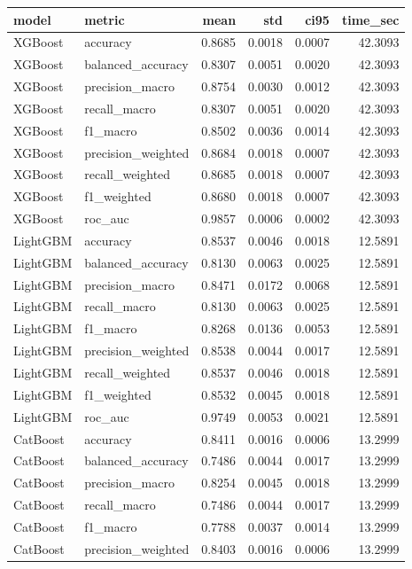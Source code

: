 \begin{tabular}{llrrrr}
\toprule
model & metric & mean & std & ci95 & time_sec \\
\midrule
XGBoost & accuracy & 0.8685 & 0.0018 & 0.0007 & 42.3093 \\
XGBoost & balanced_accuracy & 0.8307 & 0.0051 & 0.0020 & 42.3093 \\
XGBoost & precision_macro & 0.8754 & 0.0030 & 0.0012 & 42.3093 \\
XGBoost & recall_macro & 0.8307 & 0.0051 & 0.0020 & 42.3093 \\
XGBoost & f1_macro & 0.8502 & 0.0036 & 0.0014 & 42.3093 \\
XGBoost & precision_weighted & 0.8684 & 0.0018 & 0.0007 & 42.3093 \\
XGBoost & recall_weighted & 0.8685 & 0.0018 & 0.0007 & 42.3093 \\
XGBoost & f1_weighted & 0.8680 & 0.0018 & 0.0007 & 42.3093 \\
XGBoost & roc_auc & 0.9857 & 0.0006 & 0.0002 & 42.3093 \\
LightGBM & accuracy & 0.8537 & 0.0046 & 0.0018 & 12.5891 \\
LightGBM & balanced_accuracy & 0.8130 & 0.0063 & 0.0025 & 12.5891 \\
LightGBM & precision_macro & 0.8471 & 0.0172 & 0.0068 & 12.5891 \\
LightGBM & recall_macro & 0.8130 & 0.0063 & 0.0025 & 12.5891 \\
LightGBM & f1_macro & 0.8268 & 0.0136 & 0.0053 & 12.5891 \\
LightGBM & precision_weighted & 0.8538 & 0.0044 & 0.0017 & 12.5891 \\
LightGBM & recall_weighted & 0.8537 & 0.0046 & 0.0018 & 12.5891 \\
LightGBM & f1_weighted & 0.8532 & 0.0045 & 0.0018 & 12.5891 \\
LightGBM & roc_auc & 0.9749 & 0.0053 & 0.0021 & 12.5891 \\
CatBoost & accuracy & 0.8411 & 0.0016 & 0.0006 & 13.2999 \\
CatBoost & balanced_accuracy & 0.7486 & 0.0044 & 0.0017 & 13.2999 \\
CatBoost & precision_macro & 0.8254 & 0.0045 & 0.0018 & 13.2999 \\
CatBoost & recall_macro & 0.7486 & 0.0044 & 0.0017 & 13.2999 \\
CatBoost & f1_macro & 0.7788 & 0.0037 & 0.0014 & 13.2999 \\
CatBoost & precision_weighted & 0.8403 & 0.0016 & 0.0006 & 13.2999 \\

\end{tabular}
